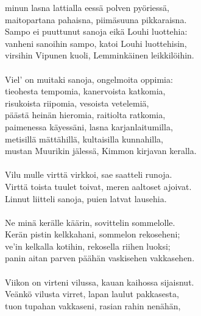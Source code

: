 minun lasna lattialla eessä polven pyöriessä,               \\
maitopartana pahaisna, piimäsuuna pikkaraisna.              \\
Sampo ei puuttunut sanoja eikä Louhi luottehia:             \\
vanheni sanoihin sampo, katoi Louhi luottehisin,            \\
virsihin Vipunen kuoli, Lemminkäinen leikkilöihin.          \\
                                                            \\
Viel' on muitaki sanoja, ongelmoita oppimia:                \\
tieohesta tempomia, kanervoista katkomia,                   \\
risukoista riipomia, vesoista vetelemiä,                    \\
päästä heinän hieromia, raitiolta ratkomia,                 \\
paimenessa käyessäni, lasna karjanlaitumilla,               \\
metisillä mättähillä, kultaisilla kunnahilla,               \\
mustan Muurikin jälessä, Kimmon kirjavan keralla.           \\
                                                            \\
Vilu mulle virttä virkkoi, sae saatteli runoja.             \\
Virttä toista tuulet toivat, meren aaltoset ajoivat.        \\
Linnut liitteli sanoja, puien latvat lausehia.              \\
                                                            \\
Ne minä kerälle käärin, sovittelin sommelolle.              \\
Kerän pistin kelkkahani, sommelon rekoseheni;               \\
ve'in kelkalla kotihin, rekosella riihen luoksi;            \\
panin aitan parven päähän vaskisehen vakkasehen.            \\
                                                            \\
Viikon on virteni vilussa, kauan kaihossa sijaisnut.        \\
Veänkö vilusta virret, lapan laulut pakkasesta,             \\
tuon tupahan vakkaseni, rasian rahin nenähän,               \\
